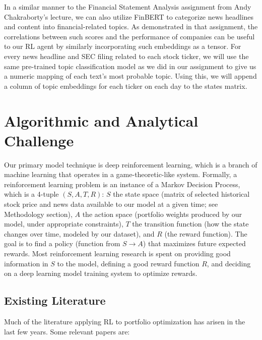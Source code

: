 In a similar manner to the Financial Statement Analysis assignment from 
Andy Chakraborty’s lecture, we can also utilize FinBERT to categorize news 
headlines and content into financial-related topics. As demonstrated in that 
assignment, the correlations between such scores and the performance of 
companies can be useful to our RL agent by similarly incorporating such 
embeddings as a tensor. For every news headline and SEC filing related to 
each stock ticker, we will use the same pre-trained topic classification model 
as we did in our assignment to give us a numeric mapping of each text’s most 
probable topic. Using this, we will append a column of topic embeddings for 
each ticker on each day to the states matrix.

\section{Algorithmic and Analytical Challenge}

Our primary model technique is deep reinforcement learning, which is a 
branch of machine learning that operates in a game-theoretic-like system. 
Formally, a reinforcement learning problem is an instance of a Markov 
Decision Process, which is a 4-tuple $(S, A, T, R)$: $S$ the state space 
(matrix of selected historical stock price and news data available to 
our model at a given time; see Methodology section), $A$ the action space 
(portfolio weights produced by our model, under appropriate constraints), 
$T$ the transition function (how the state changes over time, modeled by our dataset), 
and $R$ (the reward function). The goal is to find a policy (function from $S \to A$) 
that maximizes future expected rewards. Most reinforcement learning research is 
spent on providing good information in $S$ to the model, defining a good reward 
function $R$, and deciding on a deep learning model training system to optimize rewards.

\subsection{Existing Literature}

Much of the literature applying RL to portfolio optimization has arisen in the 
last few years. Some relevant papers are:

